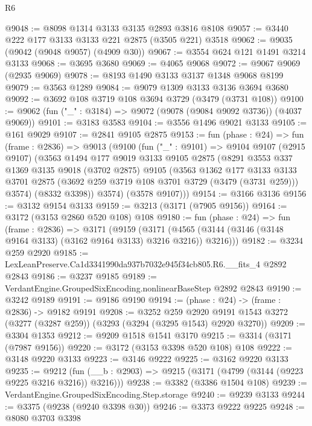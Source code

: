 \begin{lexlean}{R6}
\begin{coremodule}
@9048 := @8098 @1314 @3133 @3135 @2893 @3816 @8108
@9057 := @3440 @222 @177 @3133 @3133 @221 @2875 (@3505 @221) @3518
@9062 := @9035 (@9042 (@9048 @9057) (@4909 @30))
@9067 := @3554 @624 @121 @1491 @3214 @3133
@9068 := @3695 @3680
@9069 := @4065 @9068
@9072 := @9067 @9069 (@2935 @9069)
@9078 := @8193 @1490 @3133 @3137 @1348 @9068 @8199
@9079 := @3563 @1289
@9084 := @9079 @1309 @3133 @3136 @3694 @3680
@9092 := @3692 @108 @3719 @108 @3694 @3729 (@3479 (@3731 @108))
@9100 := @9062 (fun ("_" : @3184) => @9072 (@9078 (@9084 @9092 @3736)) (@4037 @9069))
@9101 := @3183 @3583
@9104 := @3556 @1496 @9021 @3133
@9105 := @161 @9029
@9107 := @2841 @9105 @2875
@9153 := fun (phase : @24) =>
  fun (frame : @2836) =>
  @9013
    (@9100
      (fun ("_" : @9101) =>
      @9104
        @9107
        (@2915 @9107)
        (@3563
          @1494
          @177
          @9019
          @3133
          @9105
          @2875
          (@8291
            @3553
            @337
            @1369
            @3135
            @9018
            (@3702 @2875)
            @9105
            (@3563
              @1362
              @177
              @3133
              @3133
              @3701
              @2875
              (@3692 @259 @3719 @108 @3701 @3729 (@3479 (@3731 @259)))
              @3574)
            (@8332 @3398))
          @3574)
        (@3578 @9107)))
@9154 := @3166 @3136
@9156 := @3132 @9154 @3133
@9159 := @3213 (@3171 (@7905 @9156))
@9164 := @3172 (@3153 @2860 @520 @108) @108
@9180 := fun (phase : @24) =>
  fun (frame : @2836) =>
  @3171
    (@9159
      (@3171 (@4565 (@3144 (@3146 (@3148 @9164 @3133) (@3162 @9164 @3133) @3216 @3216)) @3216)))
@9182 := @3234 @259 @2920
@9185 := LexLeanPreserve.Ca1d3341990da937b7032e945f34cb805.R6.__fits_4 @2892 @2843
@9186 := @3237 @9185
@9189 := VerdantEngine.GroupedSixEncoding.nonlinearBaseStep @2892 @2843
@9190 := @3242 @9189
@9191 := @9186 @9190
@9194 := (phase : @24) -> (frame : @2836) -> @9182 @9191
@9208 := @3252
    @259
    @2920
    @9191
    @1543
    @3272
    (@3277 (@3287 @259))
    (@3293 (@3294 (@3295 @1543) @2920 @3270))
@9209 := @3304 @1353
@9212 := @9209 @1518 @1541 @3170
@9215 := @3314 (@3171 (@7987 @9156))
@9220 := @3172 (@3153 @3398 @520 @108) @108
@9222 := @3148 @9220 @3133
@9223 := @3146 @9222
@9225 := @3162 @9220 @3133
@9235 := @9212 (fun (__b : @2903) => @9215 (@3171 (@4799 (@3144 (@9223 @9225 @3216 @3216)) @3216)))
@9238 := @3382 (@3386 @1504 @108)
@9239 := VerdantEngine.GroupedSixEncoding.Step.storage
@9240 := @9239 @3133
@9244 := @3375 (@9238 (@9240 @3398 @30))
@9246 := @3373 @9222 @9225
@9248 := @8080 @3703 @3398

\end{coremodule}
\end{lexlean}
